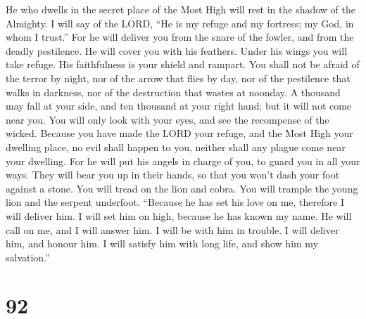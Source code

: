  He who dwells in the secret place of the Most High will
rest in the shadow of the Almighty.  I will say of the LORD,
``He is my refuge and my fortress; my God, in whom I trust.''
 For he will deliver you from the snare of the fowler, and
from the deadly pestilence.  He will cover you with his
feathers. Under his wings you will take refuge. His faithfulness is your
shield and rampart.  You shall not be afraid of the terror
by night, nor of the arrow that flies by day,  nor of the
pestilence that walks in darkness, nor of the destruction that wastes at
noonday.  A thousand may fall at your side, and ten thousand
at your right hand; but it will not come near you.  You will
only look with your eyes, and see the recompense of the wicked.
 Because you have made the LORD your refuge, and the Most
High your dwelling place,  no evil shall happen to you,
neither shall any plague come near your dwelling.  For he
will put his angels in charge of you, to guard you in all your ways.
 They will bear you up in their hands, so that you won't
dash your foot against a stone.  You will tread on the lion
and cobra. You will trample the young lion and the serpent underfoot.
 ``Because he has set his love on me, therefore I will
deliver him. I will set him on high, because he has known my name.
 He will call on me, and I will answer him. I will be with
him in trouble. I will deliver him, and honour him.  I will
satisfy him with long life, and show him my salvation.''

\hypertarget{section-82}{%
\section{92}\label{section-82}}

